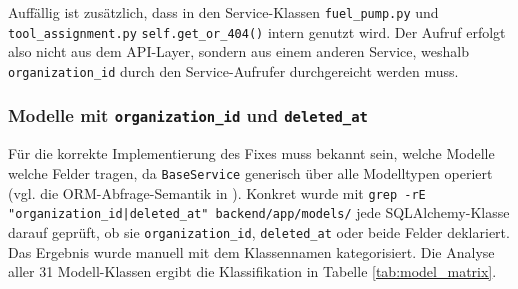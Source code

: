 Auffällig ist zusätzlich, dass in den Service-Klassen
\texttt{fuel\_pump.py} und \texttt{tool\_assignment.py}
\texttt{self.get\_or\_404()} intern genutzt wird. Der Aufruf erfolgt
also nicht aus dem API-Layer, sondern aus einem anderen Service,
weshalb \texttt{organization\_id} durch den Service-Aufrufer
durchgereicht werden muss.


\subsubsection{Modelle mit \texttt{organization\_id} und \texttt{deleted\_at}}

Für die korrekte Implementierung des Fixes muss bekannt sein, welche
Modelle welche Felder tragen, da \texttt{BaseService} generisch über alle
Modelltypen operiert (vgl. die ORM-Abfrage-Semantik in
\parencite{sqlalchemy_docs}). Konkret wurde mit
\texttt{grep -rE "organization\_id|deleted\_at" backend/app/models/} jede
SQLAlchemy-Klasse darauf geprüft, ob sie \texttt{organization\_id},
\texttt{deleted\_at} oder beide Felder deklariert. Das Ergebnis wurde manuell
mit dem Klassennamen kategorisiert. Die Analyse
aller 31 Modell-Klassen ergibt die Klassifikation in Tabelle
\ref{tab:model_matrix}.

